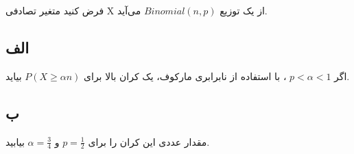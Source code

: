 فرض کنید متغیر تصادفی X از یک توزیع
$
Binomial(n, p)
$
می‌آید.
\subsection*{الف}
اگر
$
p < \alpha < 1
$
، با استفاده از نابرابری مارکوف، یک کران بالا برای 
$
P(X \ge \alpha n)
$
بیاید. 

\subsection*{ب}
مقدار عددی این کران را برای 
$
p = \frac{1}{2}
$
و
$
\alpha = \frac{3}{4}
$
بیابید.


